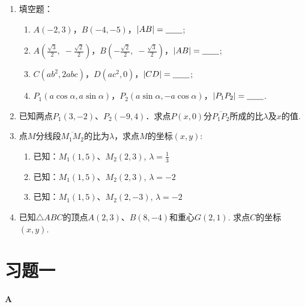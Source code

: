\begin{ex}
\begin{enumerate}
    \item 填空题：
\begin{enumerate}[(1)]
    \item $A(-2,3)$，$B(-4,-5)$，$|AB|=\underline{\qquad}$;
    \item $A\left(\frac{\sqrt{3}}{2},\; -\frac{\sqrt{2}}{2}\right)$，$B\left(-\frac{\sqrt{2}}{2},\; -\frac{\sqrt{3}}{2}\right)$，$|AB|=\underline{\qquad}$;
    \item $C(ab^2, 2abc)$，$D(ac^2,0)$，$|CD|=\underline{\qquad}$;
    \item $P_1(a\cos\alpha, a\sin\alpha)$，$P_2(a\sin\alpha,-a\cos\alpha)$，$|P_1P_2|=\underline{\qquad}$.
\end{enumerate}
    \item 已知两点$P_1(3,-2)$、$P_2(-9,4)$．求点$P(x,0)$分$\overline{P_1P_2}$所成的比$\lambda$及$x$的值.
    \item 点$M$分线段$\overline{M_1M_2}$的比为$\lambda$，求点$M$的坐标$(x,y)$:
\begin{enumerate}[(1)]
    \item 已知：$M_1(1,5)$、$M_2(2,3)$, $\lambda=\frac{1}{3}$
    \item 已知：$M_1(1,5)$、$M_2(2,3)$, $\lambda=-2$
    \item 已知：$M_1(1,5)$、$M_2(2,-3)$, $\lambda=-2$
\end{enumerate}
\item 已知$\triangle ABC$的顶点$A(2,3)$、$B(8,-4)$和重心$G(2,1)$. 求点$C$的坐标$(x,y)$.
\end{enumerate}
\end{ex}

\section*{习题一}
\begin{center}
    \bfseries A
\end{center}

